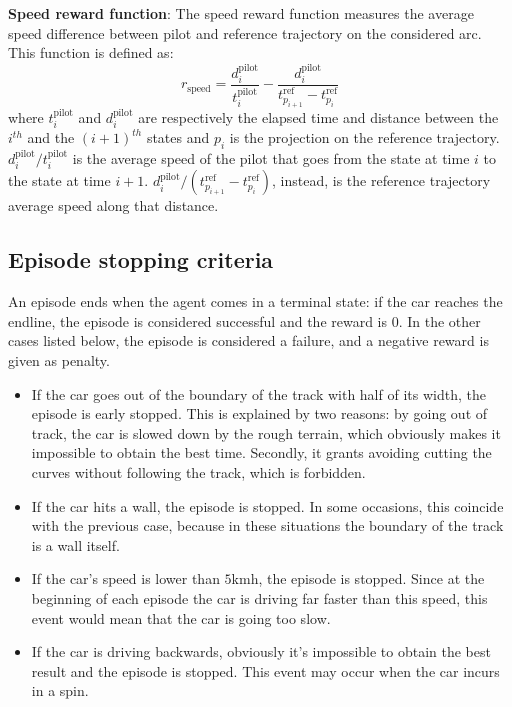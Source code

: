 \textbf{Speed reward function}: The speed reward function measures the average speed difference between pilot and reference trajectory on the considered arc. This function is defined as:
\begin{equation}r_{\text{speed}} = \frac{d^{\text{pilot}}_i}{t^{\text{pilot}}_i} - \frac{d^{\text{pilot}}_i}{t^{\text{ref}}_{p_{i+1}} - t^{\text{ref}}_{p_i} }\end{equation}
where \(t^{\text{pilot}}_i\) and  \(d^{\text{pilot}}_i\) are respectively the elapsed time and distance between the $i^{th}$ and the $(i+1)^{th}$ states and $p_i$ is the projection on the reference trajectory. ${d^{\text{pilot}}_i}/{t^{\text{pilot}}_i}$ is the average speed of the pilot that goes from the state at time $i$ to the state at time $i+1$. ${d^{\text{pilot}}_i}/({t^{\text{ref}}_{p_{i+1}} - t^{\text{ref}}_{p_i} })$, instead, is the reference trajectory average speed along that distance.


\subsection{Episode stopping criteria}
An episode ends when the agent comes in a terminal state: if the car reaches the endline, the episode is considered successful and the reward is 0.
In the other cases listed below, the episode is considered a failure, and a negative reward is given as penalty.
\begin{itemize}
    \item If the car goes out of the boundary of the track with half of its width, the episode is early stopped. This is explained by two reasons: by going out of track, the car is slowed down by the rough terrain, which obviously makes it impossible to obtain the best time. Secondly, it grants avoiding cutting the curves without following the track, which is forbidden.
    \item If the car hits a wall, the episode is stopped. In some occasions, this coincide with the previous case, because in these situations the boundary of the track is a wall itself.
    \item If the car's speed is lower than $5$kmh, the episode is stopped. Since at the beginning of each episode the car is driving far faster than this speed, this event would mean that the car is going too slow.
    \item If the car is driving backwards, obviously it's impossible to obtain the best result and the episode is stopped. This event may occur when the car incurs in a spin.
\end{itemize}




